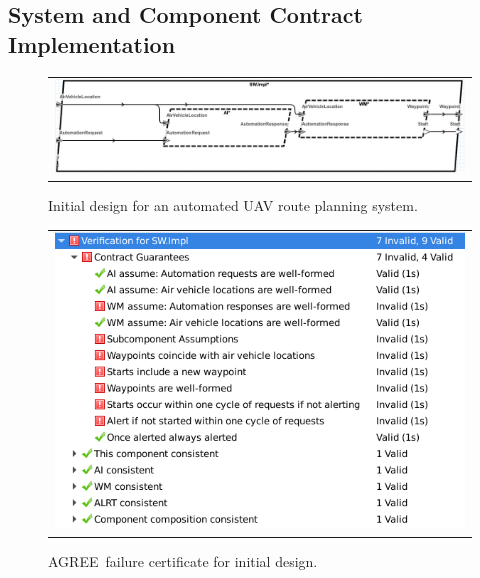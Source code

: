 \documentclass[global,twocolumn]{svjour}
\newcommand{\agr}{AGREE}
\begin{document}
\subsection{System and Component Contract Implementation}

\begin{figure}[h]
  \begin{center}
    \begin{tabular}{c}
      \includegraphics[width=\textwidth]{example.png}
    \end{tabular}
  \end{center}
\caption{Initial design for an automated UAV route planning system.}
\label{fig:example}
\end{figure}

\begin{figure}
  \begin{center}
    \begin{tabular}{c}
      \includegraphics[width=1\columnwidth]{example-certificate.png} \\
    \end{tabular}
  \end{center}
\caption{\agr\ failure certificate for initial design.}
\label{fig:example-certificate}
\end{figure}
\end{document}
